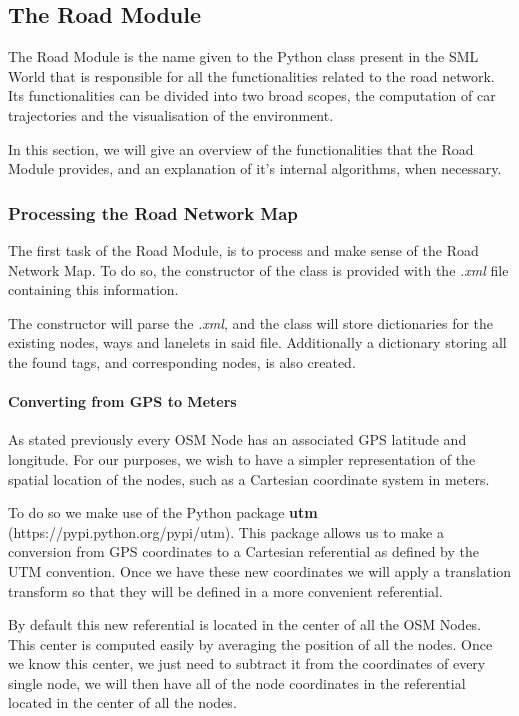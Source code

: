 
\subsection{The Road Module}
\label{sec:roadmodule}

The Road Module is the name given to the Python class present in the SML World that is responsible for all the functionalities related to the road network. Its functionalities can be divided into two broad scopes, the computation of car trajectories and the visualisation of the environment.

In this section, we will give an overview of the functionalities that the Road Module provides, and an explanation of it's internal algorithms, when necessary.

\subsubsection{Processing the Road Network Map}

The first task of the Road Module, is to process and make sense of the Road Network Map. To do so, the constructor of the class is provided with the \textit{.xml} file containing this information.

The constructor will parse the \textit{.xml}, and the class will store dictionaries for the existing nodes, ways and lanelets in said file. Additionally a dictionary storing all the found tags, and corresponding nodes, is also created.

\paragraph{Converting from GPS to Meters}

As stated previously every OSM Node has an associated GPS latitude and longitude. For our purposes, we wish to have a simpler representation of the spatial location of the nodes, such as a Cartesian coordinate system in meters.

To do so we make use of the Python package \textbf{utm} (https://pypi.python.org/pypi/utm). This package allows us to make a conversion from GPS coordinates to a Cartesian referential as defined by the UTM convention. Once we have these new coordinates we will apply a translation transform so that they will be defined in a more convenient referential.

By default this new referential is located in the center of all the OSM Nodes. This center is computed easily by averaging the position of all the nodes. Once we know this center, we just need to subtract it from the coordinates of every single node, we will then have all of the node coordinates in the referential located in the center of all the nodes.

